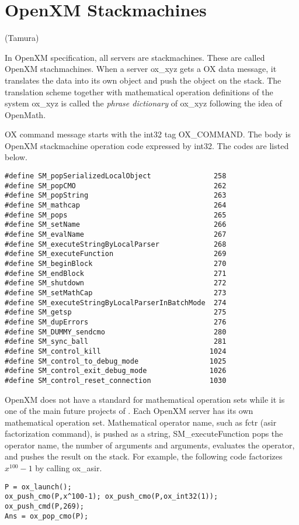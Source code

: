 
\section{OpenXM Stackmachines}   (Tamura)

In OpenXM specification, all servers are stackmachines.
These are called OpenXM stachmachines.
When a server ox\_xyz gets a OX data message,
it translates the data into its own object and push the object
on the stack.
The translation scheme together with mathematical operation definitions
of the system ox\_xyz is called the {\it phrase dictionary} of
ox\_xyz following the idea of OpenMath.

OX command message starts with the int32 tag OX\_COMMAND.
The body is OpenXM stackmachine operation code expressed by int32.
The codes are listed below.
\begin{verbatim}
#define SM_popSerializedLocalObject               258
#define SM_popCMO                                 262
#define SM_popString                              263
#define SM_mathcap                                264
#define SM_pops                                   265
#define SM_setName                                266
#define SM_evalName                               267
#define SM_executeStringByLocalParser             268
#define SM_executeFunction                        269
#define SM_beginBlock                             270
#define SM_endBlock                               271
#define SM_shutdown                               272
#define SM_setMathCap                             273
#define SM_executeStringByLocalParserInBatchMode  274
#define SM_getsp                                  275
#define SM_dupErrors                              276
#define SM_DUMMY_sendcmo                          280
#define SM_sync_ball                              281
#define SM_control_kill                          1024
#define SM_control_to_debug_mode                 1025
#define SM_control_exit_debug_mode               1026
#define SM_control_reset_connection              1030
\end{verbatim}

OpenXM does not have a standard for mathematical operation sets
while it is one of the main future projects of \cite{gap}.
Each OpenXM server has its own mathematical operation set.
Mathematical operator name, such as fctr (asir factorization command),
is pushed as a string,
SM\_executeFunction pops the operator name, the number of arguments
and arguments,
evaluates the operator, and pushes the result on the stack.
For example, the following code factorizes $x^{100}-1$ by calling
ox\_asir.
\begin{verbatim}
P = ox_launch(); 
ox_push_cmo(P,x^100-1); ox_push_cmo(P,ox_int32(1));
ox_push_cmd(P,269); 
Ans = ox_pop_cmo(P);
\end{verbatim}

